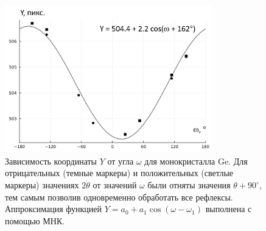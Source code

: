 \documentclass[a4paper,14pt]{extarticle}
\newcommand{\degree}{^\circ}
\begin{document}
\begin{figure}[ht!]
    \centering
    \includegraphics[width=0.8\textwidth]{eccentrGe.png}
    \caption{Зависимость координаты $Y$ от угла $\omega$ для монокристалла Ge. Для отрицательных (темные маркеры) и положительных (светлые маркеры) значениях $2\theta$ от значений $\omega$ были отняты значения $\theta + 90\degree$, тем самым позволив одновременно обработать все рефлексы. Аппроксимация функцией $Y = a_0 + a_1 \cos(\omega - \omega_1)$ выполнена с помощью МНК.}
    \label{fig:eccentrGe}
\end{figure}

\newpage


\newpage
\end{document}
